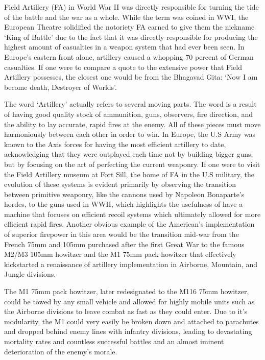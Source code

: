 \documentclass{article}
\begin{document}


  Field Artillery (FA) in World War II was directly responsible for turning the tide of the battle and the war as a whole.
While the term was coined in WWI, the European Theatre solidified the notoriety FA earned to give them the nickname
`King of Battle' due to the fact that it was directly responsible for producing the highest amount of casualties in a
weapon system that had ever been seen. In Europe's eastern front alone, artillery caused a whopping 70 percent of German
casualties. If one were to compare a quote to the extensive power that Field Artillery possesses, the closest one would be
from the Bhagavad Gita: `Now I am become death, Destroyer of Worlds'.

  The word `Artillery' actually refers to several moving parts. The word is a result of having good quality stock of
ammunition, guns, observers, fire direction, and the ability to lay accurate, rapid fires at the enemy. All of these pieces
must move harmoniously between each other in order to win. In Europe, the U.S Army was known to the Axis forces for having
the most efficient artillery to date, acknowledging that they were outplayed each time not by building bigger guns, but by
focusing on the art of perfecting the current weaponry. If one were to visit the Field Artillery museum at Fort Sill, the
home of FA in the U.S military, the evolution of these systems is evident primarily by observing the transition between
primitive weaponry, like the cannons used by Napoleon Bonaparte's hordes, to the guns used in WWII, which highlights the
usefulness of have a machine that focuses on efficient recoil systems which ultimately allowed for more efficient rapid fires.
Another obvious example of the American's implementation of superior firepower in this area would be the transition mid-war
from the French 75mm and 105mm purchased after the first Great War to the famous M2/M3 105mm howitzer and the M1 75mm pack howitzer
that effectively kickstarted a renaissance of artillery implementation in Airborne, Mountain, and Jungle divisions.

  The M1 75mm pack howitzer, later redesignated to the M116 75mm howitzer, could be towed by any small vehicle and allowed for
highly mobile units such as the Airborne divisions to leave combat as fast as they could enter. Due to it's modularity, the M1
could very easily be broken down and attached to parachutes and dropped behind enemy lines with infantry divisions, leading to
devastating mortality rates and countless successful battles and an almost iminent deterioration of the enemy's morale. 
\end{document}

